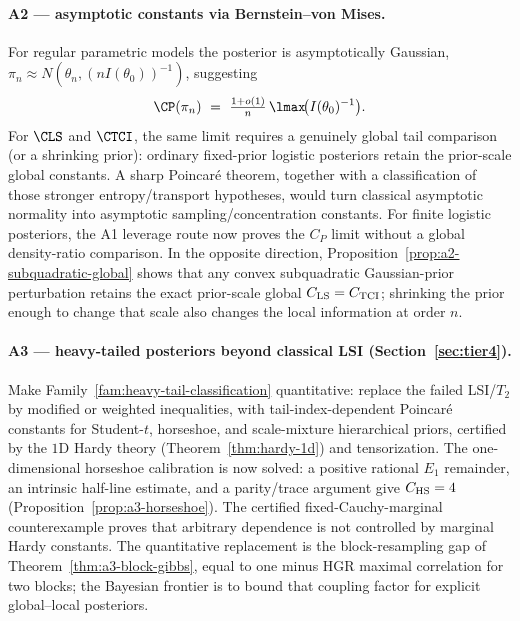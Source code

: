 \documentclass[../main.tex]{subfiles}
\begin{document}
\paragraph{A2 --- asymptotic constants via Bernstein--von Mises.}
For regular parametric models the posterior is asymptotically Gaussian,
$\pi_n\approx N(\hat\theta_n,(nI(\theta_0))^{-1})$, suggesting
\[
  \CP(\pi_n)\ =\ \tfrac{1+o(1)}{n}\,\lmax\!\big(I(\theta_0)^{-1}\big).
\]
For $\CLS$ and $\CTCI$, the same limit requires a genuinely global tail comparison (or a
shrinking prior): ordinary fixed-prior logistic posteriors retain the prior-scale global constants.
A sharp Poincar\'e theorem, together with a classification of those stronger entropy/transport
hypotheses, would turn classical asymptotic normality into asymptotic sampling/concentration
constants.
For finite logistic posteriors, the A1 leverage route now proves the
$C_P$ limit without a global density-ratio comparison. In the opposite direction,
Proposition~\ref{prop:a2-subquadratic-global} shows that any convex subquadratic Gaussian-prior
perturbation retains the exact prior-scale global $C_{\rm LS}=C_{\rm TCI}$; shrinking the prior
enough to change that scale also changes the local information at order $n$.

\paragraph{A3 --- heavy-tailed posteriors beyond classical LSI (Section~\ref{sec:tier4}).}
Make Family~\ref{fam:heavy-tail-classification} quantitative: replace the failed LSI/$T_2$ by
modified or weighted inequalities, with tail-index-dependent Poincar\'e constants for
Student-$t$, horseshoe, and scale-mixture hierarchical priors, certified by the $1$D Hardy
theory (Theorem~\ref{thm:hardy-1d}) and tensorization.
The one-dimensional horseshoe calibration is now solved: a positive rational $E_1$ remainder,
an intrinsic half-line estimate, and a parity/trace argument give
$C_{\rm HS}=4$ (Proposition~\ref{prop:a3-horseshoe}).  The certified fixed-Cauchy-marginal
counterexample proves that arbitrary dependence is not controlled by marginal Hardy constants.
The quantitative replacement is the block-resampling gap of
Theorem~\ref{thm:a3-block-gibbs}, equal to one minus HGR maximal correlation for two blocks; the
Bayesian frontier is to bound that coupling factor for explicit global--local posteriors.
\end{document}
